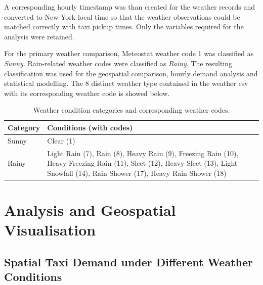 \documentclass[11pt]{article}
\begin{document}
A corresponding hourly timestamp was than created for the weather records and converted to New York 
local time so that the weather observations could be matched correctly with taxi pickup times. 
Only the variables required for the analysis were retained.

For the primary weather comparison, Meteostat weather code 1 was classified as \textit{Sunny}. 
Rain-related weather codes were classified as \textit{Rainy}. The resulting classification was used 
for the geospatial comparison, hourly demand analysis and statistical modelling. The 8 distinct weather type contained in the weather csv with its corresponding weather code is showed below.

\begin{table}[ht]
    \centering
    \caption{Weather condition categories and corresponding weather codes.}
    \label{tab:weather_categories}

    \begin{tabular}{p{} p{}}
        \toprule
        \textbf{Category} & \textbf{Conditions (with codes)} \\
        \midrule

        Sunny &
        Clear (1) \\

        Rainy &
        Light Rain (7), Rain (8), Heavy Rain (9), Freezing Rain (10),
        Heavy Freezing Rain (11), Sleet (12), Heavy Sleet (13),
        Light Snowfall (14), Rain Shower (17), Heavy Rain Shower (18) \\

        \bottomrule
    \end{tabular}
\end{table}



\section{Analysis and Geospatial Visualisation}

\subsection{Spatial Taxi Demand under Different Weather Conditions}
\end{document}
